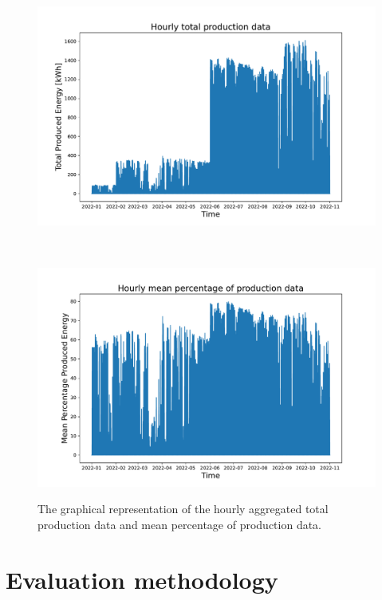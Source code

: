 \begin{figure}[H]
\begin{minipage}[b]{8.5cm}
\centering
\includegraphics[width=1\textwidth]{images/production/data_plot}
\subcaption{}
\label{fig:productiondataplot}
\end{minipage}
\ \hspace{2mm} \
\begin{minipage}[b]{8.5cm}
\centering
\includegraphics[width=1\textwidth]{images/production/data_plot_percentage}
\subcaption{}
\label{fig:productiondataplotpercentage}
\end{minipage}
\caption{The graphical representation of the hourly aggregated  total production data and  mean percentage of production data.}
\end{figure}


\section{Evaluation methodology}
\label{sec:methodology}
\vspace{0.2 cm}

